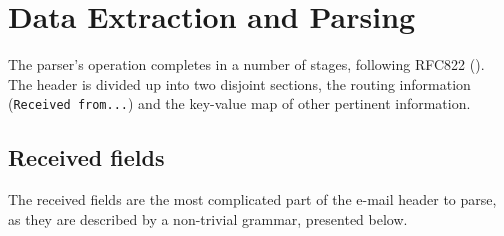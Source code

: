 \section{Data Extraction and Parsing}

The parser's operation completes in a number of stages, following RFC822
(\cite{RFC0822}).  The header is divided up into two disjoint sections, the
routing information (\texttt{Received from...}) and the key-value map of other
pertinent information.

\subsection{Received fields}

The received fields are the most complicated part of the e-mail header to parse,
as they are described by a non-trivial grammar, presented below.

